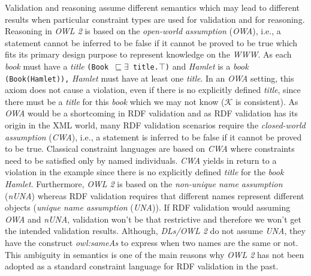 \documentclass{acm_proc_article-sp}
\newcommand{\ms}[1]{%
  \texttt{#1}
}
\newcommand{\tb}[1]{\todo[size=\small, color=green!40]{\textbf{Thomas:} #1}}
\begin{document}
Validation and reasoning assume different semantics which may lead to different results when particular constraint types are used for validation and for reasoning.
Reasoning in \emph{OWL 2} is based on the {\em open-world assumption} (\emph{OWA}), i.e., a statement cannot be inferred to be false if it cannot be proved to be true  which fits its primary design purpose to represent knowledge on the \emph{WWW}. 
As each \emph{book} must have a \emph{title} {\small\ms{(Book $\sqsubseteq \exists$ title.$\top$)}} and {\em Hamlet} is a \emph{book} {\small\ms{(Book(Hamlet)),}}
{\em Hamlet} must have at least one \emph{title}.
In an \emph{OWA} setting, this axiom does not cause a violation, even if there is no explicitly defined \emph{title}, since there must be a \emph{title} for this \emph{book} which we may not know ($\mathcal{K}$ is consistent).
As \emph{OWA} would be a shortcoming in RDF validation and
as RDF validation has its origin in the XML world, 
many RDF validation scenarios require the {\em closed-world assumption} (\emph{CWA}), i.e., a statement is inferred to be false if it cannot be proved to be true.
Classical constraint languages are based on \emph{CWA} where constraints need to be satisfied only by named individuals. 
\emph{CWA} yields in return to a violation in the example since there is no explicitly defined \emph{title} for the \emph{book} {\em Hamlet}. 
Furthermore, \emph{OWL 2} is based on the {\em non-unique name assumption} (\emph{nUNA}) whereas RDF validation requires that different names represent different objects ({\em unique name assumption} (\emph{UNA})). 
If RDF validation would assuming \emph{OWA} and \emph{nUNA}, validation won’t be that restrictive and therefore we won’t get the intended validation results.
Although, \emph{DLs/OWL 2} do not assume \emph{UNA}, they have the construct \emph{owl:sameAs} to express when two names are the same or not.
This ambiguity in semantics is one of the main reasons why \emph{OWL 2} has not been adopted as a standard constraint language for RDF validation in the past.
\end{document}
